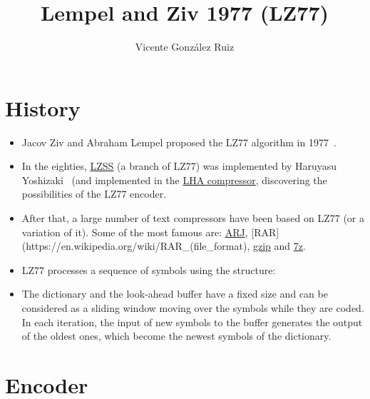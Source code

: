 
\title{Lempel and Ziv 1977 (LZ77)}

\author{Vicente González Ruiz}

\maketitle

\section{History}

\begin{itemize}
\tightlist
\item
  Jacov Ziv and Abraham Lempel proposed the LZ77 algorithm in 1977~\cite{ziv1977universal}.
\item
  In the eighties,
  \href{https://en.wikipedia.org/wiki/Lempel\%E2\%80\%93Ziv\%E2\%80\%93Storer\%E2\%80\%93Szymanski}{LZSS}
  (a branch of LZ77) was implemented by Haruyasu Yoshizaki~\cite{storer1982data} (and implemented in the
  \href{https://en.wikipedia.org/wiki/LHA_(file_format)}{LHA
  compressor}, discovering the possibilities of the LZ77 encoder.
\item
  After that, a large number of text compressors have been based on LZ77
  (or a variation of it). Some of the most famous are:
  \href{https://en.wikipedia.org/wiki/ARJ}{ARJ},
  {[}RAR{]}(https://en.wikipedia.org/wiki/RAR\_(file\_format),
  \href{https://en.wikipedia.org/wiki/Gzip}{gzip} and
  \href{https://en.wikipedia.org/wiki/7z}{7z}.
\item
  LZ77 processes a sequence of symbols using the structure:
\end{itemize}


\begin{itemize}
\tightlist
\item
  The dictionary and the look-ahead buffer have a fixed size and can be
  considered as a sliding window moving over the symbols while they are
  coded. In each iteration, the input of new symbols to the buffer
  generates the output of the oldest ones, which become the newest
  symbols of the dictionary.
\end{itemize}

\section{Encoder}

